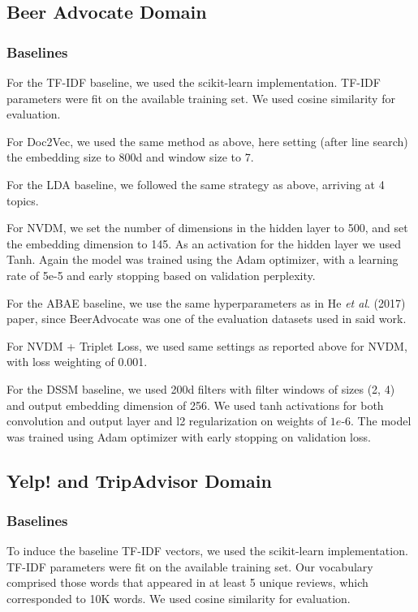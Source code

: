 \documentclass[11pt,a4paper]{article}
\begin{document}
\subsection{Beer Advocate Domain}
\subsubsection{Baselines} For the TF-IDF baseline, we used the scikit-learn implementation. TF-IDF parameters were fit on the available training set. We used cosine similarity for evaluation.

For Doc2Vec, we used the same method as above, here setting (after line search) the embedding size to 800d and window size to 7. %

For the LDA baseline, we followed the same strategy as above, arriving at 4 topics. %

For NVDM, we set the number of dimensions in the hidden layer to 500, and set the embedding dimension to 145. As an activation for the hidden layer we used Tanh. Again the model was trained using the Adam optimizer, with a learning rate of 5e-5 and early stopping based on validation perplexity. %

For the ABAE baseline, we use the same hyperparameters as in He \emph{et al}. (2017) paper, since BeerAdvocate was one of the evaluation datasets used in said work.

For NVDM + Triplet Loss, we used same settings as reported above for NVDM, with loss weighting of 0.001. %

For the DSSM baseline, we used 200d filters with filter windows of sizes (2, 4) and output embedding dimension of 256. We used tanh activations for both convolution and output layer and l2 regularization on weights of $1e$-$6$. The model was trained using Adam optimizer with early stopping on validation loss.

\subsection{Yelp! and TripAdvisor Domain}

\subsubsection{Baselines}
To induce the baseline TF-IDF vectors,  we used the scikit-learn implementation. TF-IDF parameters were fit on the available training set. Our vocabulary comprised those words that appeared in at least 5 unique reviews, which corresponded to 10K words. We used cosine similarity for evaluation. %
\end{document}
